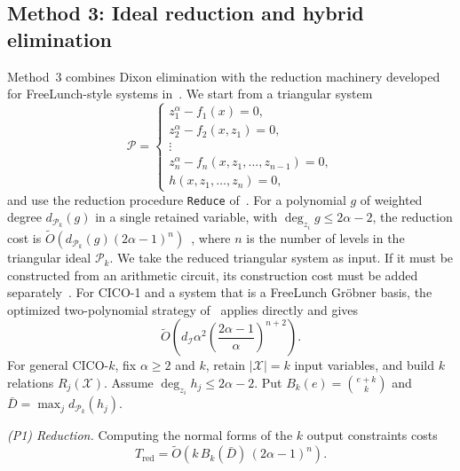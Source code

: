 \subsection{Method 3: Ideal reduction and hybrid elimination}\label{subsec:method3}
Method~3 combines Dixon elimination with the reduction machinery developed for FreeLunch-style systems in~\cite{DBLP:conf/crypto/BariantBBHOR25}. We start from a triangular system
\begin{equation}
\mathcal{P}=\left\{
\begin{array}{l}
z_1^\alpha-f_1(x)=0,\\
z_2^\alpha-f_2(x,z_1)=0,\\
\vdots\\
z_n^\alpha-f_n(x,z_1,\ldots,z_{n-1})=0,\\
h(x,z_1,\ldots,z_n)=0,
\end{array}
\right.
\label{eq:freelunch_system}
\end{equation}
and use the reduction procedure \texttt{Reduce} of~\cite[Algorithm~1]{DBLP:conf/crypto/BariantBBHOR25}. For a polynomial $g$ of weighted degree $d_{\mathcal{P}_k}(g)$ in a single retained variable, with $\deg_{z_i}g\le2\alpha-2$, the reduction cost is $\widetilde{O}(d_{\mathcal{P}_k}(g)(2\alpha-1)^n)$~\cite[Lemma~1]{DBLP:conf/crypto/BariantBBHOR25}, where $n$ is the number of levels in the triangular ideal $\mathcal{P}_k$. We take the reduced triangular system as input. If it must be constructed from an arithmetic circuit, its construction cost must be added separately~\cite[Proposition~4]{DBLP:conf/crypto/BariantBBHOR25}. For CICO-1 and a system that is a FreeLunch Gr\"obner basis, the optimized two-polynomial strategy of~\cite[Corollary~3]{DBLP:conf/crypto/BariantBBHOR25} applies directly and gives
\begin{equation}
\widetilde{O}\!\left(d_{\mathcal{I}}\alpha^2\left(\frac{2\alpha-1}{\alpha}\right)^{n+2}\right).
\label{eq:two_poly_complexity_main}
\end{equation}
For general CICO-$k$, fix $\alpha\ge2$ and $k$, retain $|\mathcal X|=k$ input variables, and build $k$ relations $R_j(\mathcal X)$. Assume $\deg_{z_i}h_j\le2\alpha-2$. Put $B_k(e)=\binom{e+k}{k}$ and $\bar D=\max_j d_{\mathcal P_k}(h_j)$.

\emph{(P1) Reduction.} Computing the normal forms of the $k$ output constraints costs
\begin{equation}
	T_{\text{red}} = \widetilde{O}\!\left(k\,B_k(\bar{D})\,(2\alpha-1)^n\right).
	\label{eq:reduction_cost}
\end{equation}

